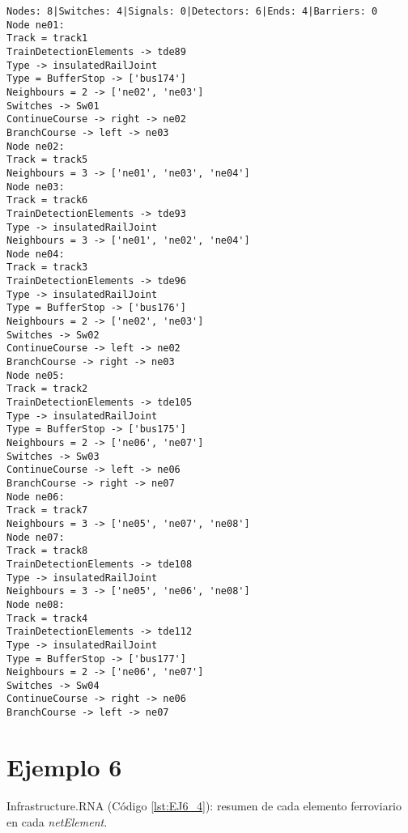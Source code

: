 	\begin{lstlisting}[language = {}, caption = Infrastructure.RNA, label = {lst:EJ5_4}]
Nodes: 8|Switches: 4|Signals: 0|Detectors: 6|Ends: 4|Barriers: 0
Node ne01:
Track = track1
TrainDetectionElements -> tde89
Type -> insulatedRailJoint
Type = BufferStop -> ['bus174']
Neighbours = 2 -> ['ne02', 'ne03']
Switches -> Sw01
ContinueCourse -> right -> ne02
BranchCourse -> left -> ne03
Node ne02:
Track = track5
Neighbours = 3 -> ['ne01', 'ne03', 'ne04']
Node ne03:
Track = track6
TrainDetectionElements -> tde93
Type -> insulatedRailJoint
Neighbours = 3 -> ['ne01', 'ne02', 'ne04']
Node ne04:
Track = track3
TrainDetectionElements -> tde96
Type -> insulatedRailJoint
Type = BufferStop -> ['bus176']
Neighbours = 2 -> ['ne02', 'ne03']
Switches -> Sw02
ContinueCourse -> left -> ne02
BranchCourse -> right -> ne03
Node ne05:
Track = track2
TrainDetectionElements -> tde105
Type -> insulatedRailJoint
Type = BufferStop -> ['bus175']
Neighbours = 2 -> ['ne06', 'ne07']
Switches -> Sw03
ContinueCourse -> left -> ne06
BranchCourse -> right -> ne07
Node ne06:
Track = track7
Neighbours = 3 -> ['ne05', 'ne07', 'ne08']
Node ne07:
Track = track8
TrainDetectionElements -> tde108
Type -> insulatedRailJoint
Neighbours = 3 -> ['ne05', 'ne06', 'ne08']
Node ne08:
Track = track4
TrainDetectionElements -> tde112
Type -> insulatedRailJoint
Type = BufferStop -> ['bus177']
Neighbours = 2 -> ['ne06', 'ne07']
Switches -> Sw04
ContinueCourse -> right -> ne06
BranchCourse -> left -> ne07
	\end{lstlisting}	
	\section{Ejemplo 6}
	Infrastructure.RNA (Código \ref{lst:EJ6_4}): resumen de cada elemento ferroviario en cada \textit{netElement}.
	

